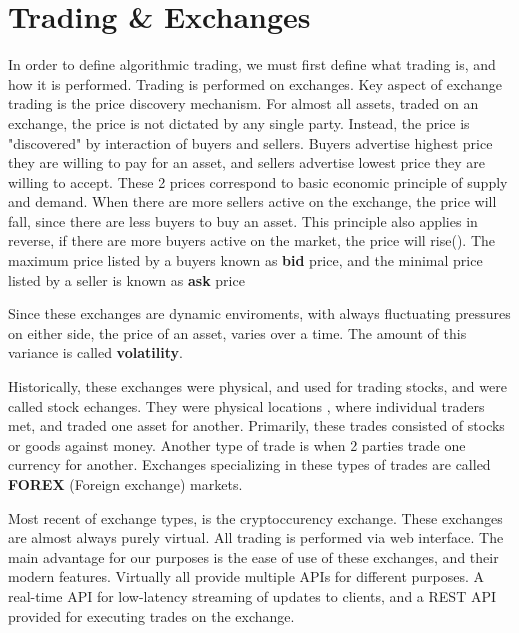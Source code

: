 \section{Trading \& Exchanges}
In order to define algorithmic trading, we must first define what trading is, and how it is performed.
Trading is performed on exchanges. Key aspect of exchange trading is the price discovery mechanism. For almost all assets,
traded on an exchange, the price is not dictated by any single party. Instead, the price is "discovered" by interaction of
buyers and sellers. Buyers advertise highest price they are willing to pay for an asset, and sellers advertise lowest price
they are willing to accept. These 2 prices correspond to basic economic principle of supply and demand. When there are more sellers active
on the exchange, the price will fall, since there are less buyers to buy an asset. This principle also applies in reverse, if there are more
buyers active on the market, the price will rise().
The maximum price listed by a buyers known as \textbf{bid} price, and the minimal price listed by a seller is known as \textbf{ask} price

Since these exchanges are dynamic enviroments, with always fluctuating pressures on either side, the price of an asset, varies over a time.
The amount of this variance is called \textbf{volatility}.

Historically, these exchanges were physical, and used for trading stocks, and
were called stock echanges. They were physical locations , where individual traders  met, and traded one asset for another.
Primarily, these trades consisted of stocks or goods against money. Another type of trade is when 2 parties trade one currency for another.
Exchanges specializing in these types of trades are called \textbf{FOREX} (Foreign exchange) markets.

Most recent of exchange types, is the cryptoccurency exchange. These exchanges are almost always purely virtual. All trading is performed
via web interface. The main advantage for our purposes is the ease of use of these exchanges, and their modern features.
Virtually all provide multiple APIs for different purposes. A real-time API for low-latency streaming of updates to clients,
and a REST API provided for executing trades on the exchange.
